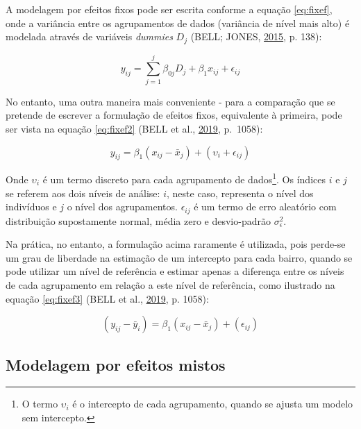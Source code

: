 \documentclass[
  a4paper, 11pt]{article}
\begin{document}
A modelagem por efeitos fixos pode ser escrita conforme a equação
\ref{eq:fixef}, onde a variância entre os agrupamentos de dados
(variância de nível mais alto) é modelada através de variáveis
\emph{dummies} \(D_j\) (BELL; JONES,
\protect\hyperlink{ref-bell2015}{2015}, p. 138):

\begin{equation} \label{eq:fixef}
y_{ij} = \sum_{j=1}^{j}\beta_{0j}D_j + \beta_1 x_{ij} + \epsilon_{ij}
\end{equation}

No entanto, uma outra maneira mais conveniente - para a comparação que
se pretende de escrever a formulação de efeitos fixos, equivalente à
primeira, pode ser vista na equação \ref{eq:fixef2} (BELL et al.,
\protect\hyperlink{ref-bell2019}{2019}, p.~1058):

\begin{equation} \label{eq:fixef2}
y_{ij} = \beta_1 (x_{ij} - \bar{x}_j) + (\upsilon_i + \epsilon_{ij}) 
\end{equation}

Onde \(\upsilon_i\) é um termo discreto para cada agrupamento de
dados\footnote{O termo \(\upsilon_i\) é o intercepto de cada
  agrupamento, quando se ajusta um modelo sem intercepto.}. Os índices
\(i\) e \(j\) se referem aos dois níveis de análise: \(i\), neste caso,
representa o nível dos indivíduos e \(j\) o nível dos agrupamentos.
\(\epsilon_{ij}\) é um termo de erro aleatório com distribuição
supostamente normal, média zero e desvio-padrão \(\sigma_{\epsilon}^2\).

Na prática, no entanto, a formulação acima raramente é utilizada, pois
perde-se um grau de liberdade na estimação de um intercepto para cada
bairro, quando se pode utilizar um nível de referência e estimar apenas
a diferença entre os níveis de cada agrupamento em relação a este nível
de referência, como ilustrado na equação \ref{eq:fixef3} (BELL et al.,
\protect\hyperlink{ref-bell2019}{2019}, p. 1058):

\begin{equation} \label{eq:fixef3}
(y_{ij} - \bar{y}_i) = \beta_1 (x_{ij} - \bar{x}_j) + (\epsilon_{ij}) 
\end{equation}

\hypertarget{modelagem-por-efeitos-mistos}{%
\subsection{Modelagem por efeitos
mistos}\label{modelagem-por-efeitos-mistos}}
\end{document}
